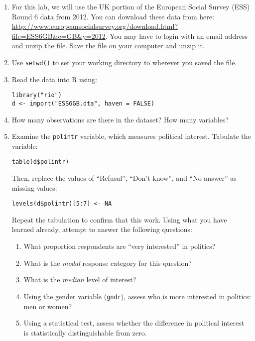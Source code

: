 \documentclass[a4paper,12pt]{article}
\begin{document}
\begin{enumerate}
\item For this lab, we will use the UK portion of the European Social Survey (ESS) Round 6 data from 2012. You can download these data from here: \url{http://www.europeansocialsurvey.org/download.html?file=ESS6GB&c=GB&y=2012}. You may have to login with an email address and unzip the file. Save the file on your computer and unzip it.

\item Use \texttt{setwd()} to set your working directory to wherever you saved the file.

\item Read the data into R using: 

\begin{verbatim}
library("rio")
d <- import("ESS6GB.dta", haven = FALSE)
\end{verbatim}

\item How many observations are there in the dataset? How many variables?

\item Examine the \texttt{polintr} variable, which measures political interest. Tabulate the variable:

\begin{verbatim}
table(d$polintr)
\end{verbatim}

\noindent Then, replace the values of ``Refusal'', ``Don't know'', and ``No answer'' as missing values: 

\begin{verbatim}
levels(d$polintr)[5:7] <- NA
\end{verbatim}

\noindent Repeat the tabulation to confirm that this work. Using what you have learned already, attempt to answer the following questions:

\begin{enumerate}
\item What proportion respondents are ``very interested'' in politics?	
\item What is the \textit{modal} response category for this question?
\item What is the \textit{median} level of interest?
\item Using the gender variable (\texttt{gndr}), assess who is more interested in politics: men or women?
\item Using a statistical test, assess whether the difference in political interest is statistically distinguishable from zero.
\end{enumerate}


\end{enumerate}
\end{document}
